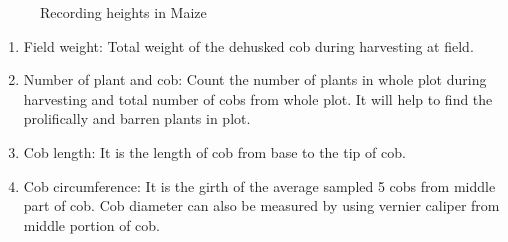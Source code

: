 \documentclass[
]{article}
\begin{document}
\begin{figure}

{\centering {}

}

\caption{Recording heights in Maize}\label{fig:maize-ear-height}
\end{figure}

\begin{enumerate}
\def\labelenumi{\arabic{enumi}.}
\setcounter{enumi}{5}
\item
  Field weight: Total weight of the dehusked cob during harvesting at field.
\item
  Number of plant and cob: Count the number of plants in whole plot during harvesting and total number of cobs from whole plot. It will help to find the prolifically and barren plants in plot.
\item
  Cob length: It is the length of cob from base to the tip of cob.
\item
  Cob circumference: It is the girth of the average sampled 5 cobs from middle part of cob. Cob diameter can also be measured by using vernier caliper from middle portion of cob.
\end{enumerate}
\end{document}
